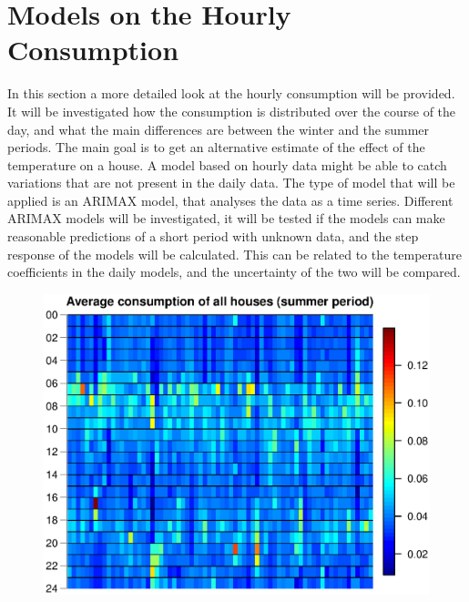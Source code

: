 \chapter{Models on the Hourly Consumption}
\label{chap: hourly}
In this section a more detailed look at the hourly consumption will be provided. It will be investigated how the consumption is distributed over the course of the day, and what the main differences are between the winter and the summer periods. The main goal is to get an alternative estimate of the effect of the temperature on a house. A model based on hourly data might be able to catch variations that are not present in the daily data. The type of model that will be applied is an ARIMAX model, that analyses the data as a time series. Different ARIMAX models will be investigated, it will be tested if the models can make reasonable predictions of a short period with unknown data, and the step response of the models will be calculated. This can be related to the temperature coefficients in the daily models, and the uncertainty of the two will be compared.
\begin{figure}
    \centering
    \includegraphics[scale=0.80]{../../../figures/Heatmap_summer.eps}
\end{figure}

